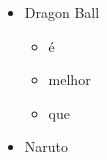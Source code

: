 \documentclass{article}
\begin{document}
\renewcommand\labelitemi{-} %
\renewcommand\labelitemii{.} %

\begin{itemize}
  \item Dragon Ball

  \begin{itemize}
    \item é
    \item melhor
    \item que
  \end{itemize}

	\item Naruto
\end{itemize}


%
\end{document}
